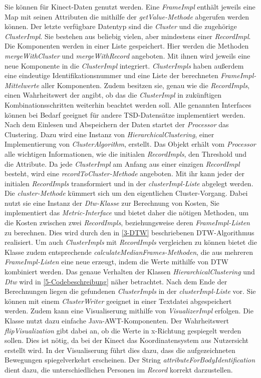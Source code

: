 Sie können für Kinect-Daten genutzt werden.
Eine \emph{FrameImpl} enthält jeweils eine Map mit seinen Attributen die mithilfe der \emph{getValue-Methode}
abgerufen werden können.
Der letzte verfügbare Datentyp sind die \emph{Cluster} und die zugehörige \emph{ClusterImpl}.
Sie bestehen aus beliebig vielen, aber mindestens einer \emph{RecordImpl}.
Die Komponenten werden in einer Liste gespeichert.
Hier werden die Methoden \emph{mergeWithCluster} und \emph{mergeWithRecord} angeboten.
Mit ihnen wird jeweils eine neue Komponente in die \emph{ClusterImpl} integriert.
\emph{ClusterImpls} haben außerdem eine eindeutige Identifikationsnummer und eine Liste der berechneten
\emph{FrameImpl-Mittelwerte} aller Komponenten.
Zudem besitzen sie, genau wie die \emph{RecordImpls}, einen Wahrheitswert der angibt,
ob das die \emph{ClusterImpl} in zukünftigen Kombinationsschritten weiterhin beachtet werden soll.
Alle genannten Interfaces können bei Bedarf geeignet für andere \ac{TSD}-Datensätze implementiert werden.
Nach dem Einlesen und Abspeichern der Daten startet der \emph{Processor} das Clustering.
Dazu wird eine Instanz von \emph{HierarchicalClustering}, einer Implementierung von \emph{ClusterAlgorithm}, erstellt.
Das Objekt erhält vom \emph{Processor} alle wichtigen Informationen,
wie die initialen \emph{RecordImpls}, den Threshold und die Attribute.
Da jede \emph{ClusterImpl} am Anfang aus einer einzigen \emph{RecordImpl} besteht,
wird eine \emph{recordToCluster-Methode} angeboten.
Mit ihr kann jeder der initialen \emph{RecordImpls} transformiert und in der \emph{clusterImpl-Liste} abgelegt werden.
Die \emph{cluster-Methode} kümmert sich um den eigentlichen Cluster-Vorgang.
Dabei nutzt sie eine Instanz der \emph{Dtw-Klasse} zur Berechnung von Kosten,
Sie implementiert das \emph{Metric-Interface} und bietet daher die nötigen Methoden,
um die Kosten zwischen zwei \emph{RecordImpls}, beziehungsweise deren \emph{FrameImpl-Listen} zu berechnen.
Dies wird durch den in \autoref{3-DTW} beschriebenen \ac{DTW}-Algorithmus realisiert.
Um auch \emph{ClusterImpls} mit \emph{RecordImpls} vergleichen zu können bietet die Klasse zudem entsprechende
\emph{calculateMedianFrames-Methoden}, die aus mehreren \emph{FrameImpl-Listen} eine neue erzeugt,
indem die Werte mithilfe von \ac{DTW} kombiniert werden.
Das genaue Verhalten der Klassen \emph{HierarchicalClustering} und \emph{Dtw} wird in \autoref{5-Codebeschreibung} näher betrachtet.
Nach dem Ende der Berechnungen liegen die gefundenen \emph{ClusterImpls} in der \emph{clusterImpl-Liste} vor.
Sie können mit einem \emph{ClusterWriter} geeignet in einer Textdatei abgespeichert werden.
Zudem kann eine Visualiserung mithilfe von \emph{VisualizerImpl} erfolgen.
Die Klasse nutzt dazu einfache Java-AWT-Komponenten.
Der Wahrheitswert \emph{flipVisualization} gibt dabei an,
ob die Werte in x-Richtung gespiegelt werden sollen.
Dies ist nötig, da bei der Kinect das Koordinatensystem aus Nutzersicht erstellt wird.
In der Visualiserung führt dies dazu, dass die aufgezeichneten Bewegungen spiegelverkehrt erscheinen.
Der String \emph{attributeForBodyIdentification} dient dazu,
die unterschiedlichen Personen im \emph{Record} korrekt darzustellen.

